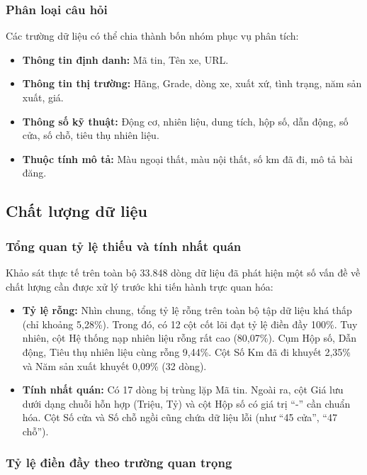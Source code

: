 \subsubsection{Phân loại câu hỏi}

Các trường dữ liệu có thể chia thành bốn nhóm phục vụ phân tích:

\begin{itemize}
    \item \textbf{Thông tin định danh:} Mã tin, Tên xe, URL.
    \item \textbf{Thông tin thị trường:} Hãng, Grade, dòng xe, xuất xứ, tình trạng, năm sản xuất, giá.
    \item \textbf{Thông số kỹ thuật:} Động cơ, nhiên liệu, dung tích, hộp số, dẫn động, số cửa, số chỗ, tiêu thụ nhiên liệu.
    \item \textbf{Thuộc tính mô tả:} Màu ngoại thất, màu nội thất, số km đã đi, mô tả bài đăng.
\end{itemize}

\subsection{Chất lượng dữ liệu}

\subsubsection{Tổng quan tỷ lệ thiếu và tính nhất quán}

Khảo sát thực tế trên toàn bộ 33.848 dòng dữ liệu đã phát hiện một số vấn đề về chất lượng cần được xử lý trước khi tiến hành trực quan hóa:
\begin{itemize}
    \item \textbf{Tỷ lệ rỗng:} Nhìn chung, tổng tỷ lệ rỗng trên toàn bộ tập dữ liệu khá thấp (chỉ khoảng 5,28\%). Trong đó, có 12 cột cốt lõi đạt tỷ lệ điền đầy 100\%. Tuy nhiên, cột Hệ thống nạp nhiên liệu rỗng rất cao (80,07\%). Cụm Hộp số, Dẫn động, Tiêu thụ nhiên liệu cùng rỗng 9,44\%. Cột Số Km đã đi khuyết 2,35\% và Năm sản xuất khuyết 0,09\% (32 dòng).
    \item \textbf{Tính nhất quán:} Có 17 dòng bị trùng lặp Mã tin. Ngoài ra, cột Giá lưu dưới dạng chuỗi hỗn hợp (Triệu, Tỷ) và cột Hộp số có giá trị ``-'' cần chuẩn hóa. Cột Số cửa và Số chỗ ngồi cũng chứa dữ liệu lỗi (như ``45 cửa'', ``47 chỗ'').
\end{itemize}

\subsubsection{Tỷ lệ điền đầy theo trường quan trọng}

